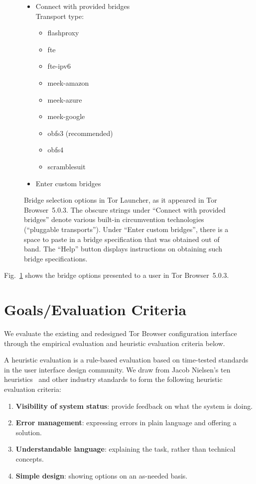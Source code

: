 \documentclass[USenglish,oneside,twocolumn]{article}
\begin{document}
\begin{figure}
\small
\begin{itemize}
\renewcommand{\labelitemi}{$\circ$}
\item Connect with provided bridges\\
Transport type:
\begin{itemize}
\item flashproxy
\item fte
\item fte-ipv6
\item meek-amazon
\item meek-azure
\item meek-google
\item obfs3 (recommended)
\item obfs4
\item scramblesuit
\end{itemize}
\item Enter custom bridges\qquad{}\\
\end{itemize}
\caption{
Bridge selection options in Tor Launcher, as it appeared in Tor Browser~5.0.3.
The obscure strings under ``Connect with provided bridges'' denote various
built-in circumvention technologies (``pluggable transports'').
Under ``Enter custom bridges'', there is a space to paste in
a bridge specification that was obtained out of band.
The ``Help'' button displays instructions on obtaining such
bridge specifications.
}
\label{fig:bridge-options}
\end{figure}

Fig.~\ref{fig:bridge-options} shows the bridge options
presented to a user in Tor Browser~5.0.3.

\section{Goals/Evaluation Criteria}
\label{sec:goals}
We evaluate the existing and redesigned Tor Browser configuration interface 
through the empirical evaluation and heuristic evaluation criteria below. 

A heuristic evaluation is a rule-based evaluation based on time-tested standards
in the user interface design community. We draw from Jacob Nielsen's ten heuristics~\cite{nielsen1994heuristic}
and other industry standards to form the following heuristic evaluation criteria: \\

\begin{enumerate}
    \item  {\bfseries Visibility of system status}: provide feedback on what the system is doing. 
    \item  {\bfseries Error management}: expressing errors in plain language and offering a solution. 
    \item  {\bfseries Understandable language}: explaining the task, rather than technical concepts. 
    \item  {\bfseries Simple design}: showing options on an as-needed basis. 
\end{enumerate}
\end{document}

